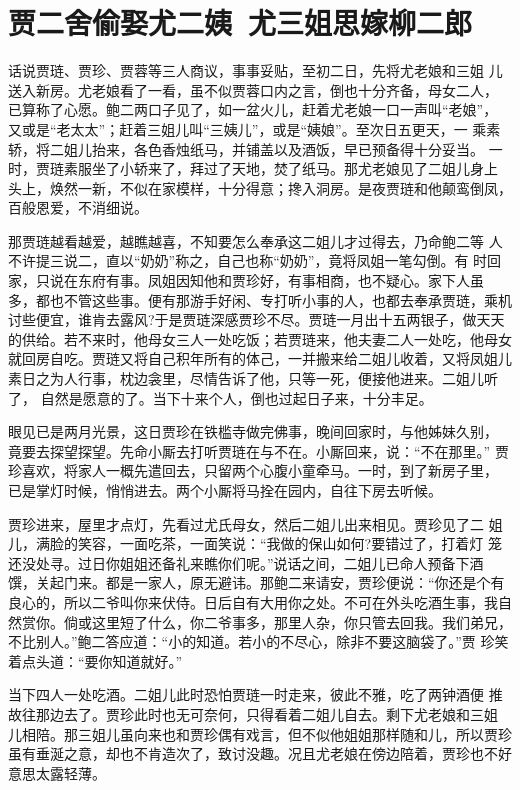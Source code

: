 \chapter{贾二舍偷娶尤二姨~尤三姐思嫁柳二郎}

话说贾琏、贾珍、贾蓉等三人商议，事事妥贴，至初二日，先将尤老娘和三姐
儿送入新房。尤老娘看了一看，虽不似贾蓉口内之言，倒也十分齐备，母女二人，
已算称了心愿。鲍二两口子见了，如一盆火儿，赶着尤老娘一口一声叫“老娘”，
又或是“老太太”；赶着三姐儿叫“三姨儿”，或是“姨娘”。至次日五更天，一
乘素轿，将二姐儿抬来，各色香烛纸马，并铺盖以及酒饭，早已预备得十分妥当。
一时，贾琏素服坐了小轿来了，拜过了天地，焚了纸马。那尤老娘见了二姐儿身上
头上，焕然一新，不似在家模样，十分得意；搀入洞房。是夜贾琏和他颠鸾倒凤，
百般恩爱，不消细说。

那贾琏越看越爱，越瞧越喜，不知要怎么奉承这二姐儿才过得去，乃命鲍二等
人不许提三说二，直以“奶奶”称之，自己也称“奶奶”，竟将凤姐一笔勾倒。有
时回家，只说在东府有事。凤姐因知他和贾珍好，有事相商，也不疑心。家下人虽
多，都也不管这些事。便有那游手好闲、专打听小事的人，也都去奉承贾琏，乘机
讨些便宜，谁肯去露风?于是贾琏深感贾珍不尽。贾琏一月出十五两银子，做天天
的供给。若不来时，他母女三人一处吃饭；若贾琏来，他夫妻二人一处吃，他母女
就回房自吃。贾琏又将自己积年所有的体己，一并搬来给二姐儿收着，又将凤姐儿
素日之为人行事，枕边衾里，尽情告诉了他，只等一死，便接他进来。二姐儿听了，
自然是愿意的了。当下十来个人，倒也过起日子来，十分丰足。

眼见已是两月光景，这日贾珍在铁槛寺做完佛事，晚间回家时，与他姊妹久别，
竟要去探望探望。先命小厮去打听贾琏在与不在。小厮回来，说：“不在那里。”
贾珍喜欢，将家人一概先遣回去，只留两个心腹小童牵马。一时，到了新房子里，
已是掌灯时候，悄悄进去。两个小厮将马拴在园内，自往下房去听候。

贾珍进来，屋里才点灯，先看过尤氏母女，然后二姐儿出来相见。贾珍见了二
姐儿，满脸的笑容，一面吃茶，一面笑说：“我做的保山如何?要错过了，打着灯
笼还没处寻。过日你姐姐还备礼来瞧你们呢。”说话之间，二姐儿已命人预备下酒
馔，关起门来。都是一家人，原无避讳。那鲍二来请安，贾珍便说：“你还是个有
良心的，所以二爷叫你来伏侍。日后自有大用你之处。不可在外头吃酒生事，我自
然赏你。倘或这里短了什么，你二爷事多，那里人杂，你只管去回我。我们弟兄，
不比别人。”鲍二答应道：“小的知道。若小的不尽心，除非不要这脑袋了。”贾
珍笑着点头道：“要你知道就好。”

当下四人一处吃酒。二姐儿此时恐怕贾琏一时走来，彼此不雅，吃了两钟酒便
推故往那边去了。贾珍此时也无可奈何，只得看着二姐儿自去。剩下尤老娘和三姐
儿相陪。那三姐儿虽向来也和贾珍偶有戏言，但不似他姐姐那样随和儿，所以贾珍
虽有垂涎之意，却也不肯造次了，致讨没趣。况且尤老娘在傍边陪着，贾珍也不好
意思太露轻薄。

